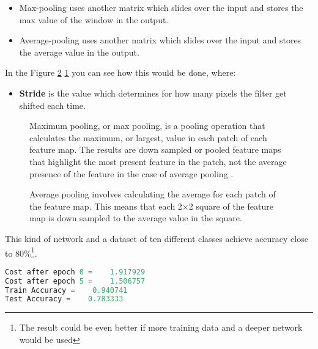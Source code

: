 \begin{itemize}
	\item Max-pooling uses another matrix which slides over the input and stores the max value of the window in the output.
	\item Average-pooling uses another matrix which slides over the input and stores the average value in the output.
\end{itemize}

In the Figure \ref{fig:avg} \ref{fig:max} you can see how this would be done, where:
\begin{itemize}
	\item \textbf{Stride} is the value which determines for how many pixels the filter get shifted each time.
\end{itemize}

\begin{figure}[htp]
	\centering
	\caption{Maximum pooling, or max pooling, is a pooling operation that calculates the maximum, or largest, value in each patch of each feature map. The results are down sampled or pooled feature maps that highlight the most present feature in the patch, not the average presence of the feature in the case of average pooling \cite{}.}
	\label{fig:max}
\end{figure}
\begin{figure}[htp]
	\centering
	\caption{Average pooling involves calculating the average for each patch of the feature map. This means that each 2×2 square of the feature map is down sampled to the average value in the square.}
	\label{fig:avg}
\end{figure}

This kind of network and a dataset of ten different classes achieve accuracy close to 80\%\footnote{The result could be even better if more training data and a deeper network would be used}.

\begin{lstlisting}[captionpos=b,label={lst:cnn}, float=tb,language=Python, caption=Test accuracy is 80\% after iterations 2400 times and using 209 examples with 12288 features (\(64\times64 \) pixels). That accuracy is not state of the art but very good if considering that this is an algorithm which is not specialized to recognize images.]
Cost after epoch 0 =    1.917929
Cost after epoch 5 =    1.506757
Train Accuracy =    0.940741
Test Accuracy =    0.783333
\end{lstlisting}

